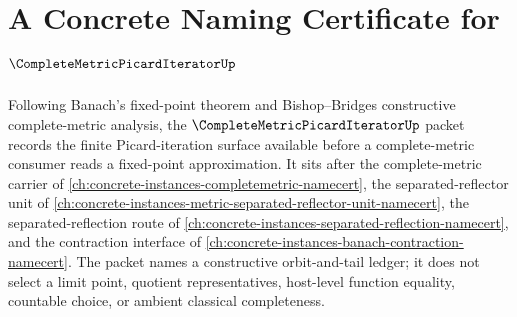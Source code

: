 \chapter{A Concrete Naming Certificate for $\CompleteMetricPicardIteratorUp$}
\label{ch:concrete-instances-complete-metric-picard-iterator-namecert}

Following Banach's fixed-point theorem and Bishop--Bridges constructive complete-metric analysis, the $\CompleteMetricPicardIteratorUp$ packet records the finite Picard-iteration surface available before a complete-metric consumer reads a fixed-point approximation. It sits after the complete-metric carrier of \autoref{ch:concrete-instances-completemetric-namecert}, the separated-reflector unit of \autoref{ch:concrete-instances-metric-separated-reflector-unit-namecert}, the separated-reflection route of \autoref{ch:concrete-instances-separated-reflection-namecert}, and the contraction interface of \autoref{ch:concrete-instances-banach-contraction-namecert}. The packet names a constructive orbit-and-tail ledger; it does not select a limit point, quotient representatives, host-level function equality, countable choice, or ambient classical completeness.

